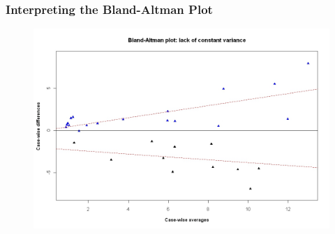 \documentclass[compress]{beamer}        %
\begin{document}
		\begin{frame}
			\frametitle{Interpreting the Bland-Altman Plot}
			\begin{figure}
				\centering
				\includegraphics[width=0.85\linewidth]{images/BAFanEffect}
				\caption{}
				\label{fig:BAFanEffect}
			\end{figure}
			
		\end{frame}
		
\end{document}
